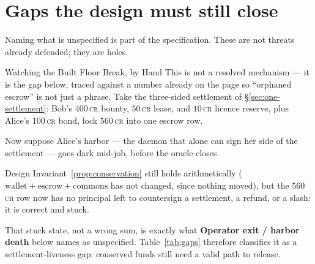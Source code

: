 \documentclass[11pt,a4paper]{article}
\theoremstyle{definition}
\theoremstyle{definition}
\theoremstyle{remark}
\begin{document}
\section{Gaps the design must still close}\label{sec:gaps}

Naming what is unspecified is part of the specification. These are not threats
already defended; they are holes.

\begin{pdexample}{Watching the Built Floor Break, by Hand}
\setlength{\parskip}{4pt plus 1pt}
This is not a resolved mechanism --- it is the gap below, traced against a
number already on the page so ``orphaned escrow'' is not just a phrase. Take
the three-sided settlement of \S\ref{sec:one-settlement}: Bob's $400$\,\textsc{cr}
bounty, $50$\,\textsc{cr} lease, and $10$\,\textsc{cr} licence reserve, plus
Alice's $100$\,\textsc{cr} bond, lock $560$\,\textsc{cr} into one escrow row.

Now suppose Alice's harbor --- the daemon that alone can sign her side of the
settlement --- goes dark mid-job, before the oracle closes.

Design
Invariant~\ref{prop:conservation} still holds arithmetically
($\text{wallet}+\text{escrow}+\text{commons}$ has not changed, since nothing
moved), but the $560$\,\textsc{cr} row now has no principal left to countersign
a settlement, a refund, or a slash: it is correct and stuck.

That stuck state,
not a wrong sum, is exactly what \textbf{Operator exit / harbor death} below
names as unspecified. Table~\ref{tab:gaps} therefore classifies it as a
settlement-liveness gap: conserved funds still need a valid path to release.
\end{pdexample}
\end{document}
